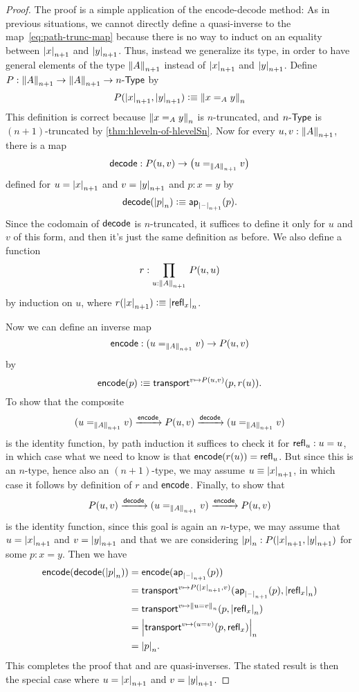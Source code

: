 \begin{proof}
  The proof is a simple application of the encode-decode method:
  As in previous situations, we cannot directly define a quasi-inverse to the map~\eqref{eq:path-trunc-map} because there is no way to induct on an
equality between $\tproj {n+1}x$ and $\tproj {n+1}y$.
  Thus, instead we generalize its type, in order to have general elements of the type $\trunc{n+1}A$ instead of $\tproj {n+1}x$ and $\tproj
{n+1}y$.
  Define $P:\trunc {n+1}A\to\trunc {n+1}A\to\typele{n}$ by
  \[P(\tproj {n+1}x,\tproj {n+1}y)\defeq \trunc n{x=_Ay}\]
  This definition is correct because $\trunc n{x=_Ay}$ is $n$-truncated, and $\typele{n}$ is $(n+1)$-truncated by
\cref{thm:hleveln-of-hlevelSn}.
  Now for every $u,v:\trunc{n+1}A$, there is a map
  \[\decode:P(u,v) \to \big(u=_{\trunc{n+1}A}v\big)\]
  defined for $u=\tproj {n+1}x$ and $v=\tproj {n+1}y$ and $p:x=y$ by
  \[\decode(\tproj n{p})\defeq \apfunc{\tprojf{n+1}} (p).\]
  Since the codomain of $\decode$ is $n$-truncated, it suffices to define it only for $u$ and $v$ of this form, and then it's just the same
definition as before.
  We also define a function
  \[ r : \prd{u:\trunc{n+1} A} P(u,u) \]
  by induction on $u$, where $r(\tproj{n+1} x) \defeq \tproj n {\refl x}$.

  Now we can define an inverse map
  \[\encode: (u=_{\trunc{n+1}A}v) \to P(u,v)\]
  by
  \[\encode(p) \defeq \transfib{v\mapsto P(u,v)}{p}{r(u)}. \]
  To show that the composite
  \[ (u=_{\trunc{n+1}A}v) \xrightarrow{\encode} P(u,v) \xrightarrow{\decode} (u=_{\trunc{n+1}A}v) \]
  is the identity function, by path induction it suffices to check it for $\refl u : u=u$, in which case what we need to know is that
$\encode(r(u)) = \refl{u}$.
  But since this is an $n$-type, hence also an $(n+1)$-type, we may assume $u\jdeq \tproj {n+1} x$, in which case it follows by definition
of $r$ and $\encode$.
  Finally, to show that
  \[ P(u,v) \xrightarrow{\decode} (u=_{\trunc{n+1}A}v) \xrightarrow{\encode} P(u,v) \]
  is the identity function, since this goal is again an $n$-type, we may assume that $u=\tproj {n+1}x$ and $v=\tproj {n+1}y$ and that we are
considering $\tproj n p:P(\tproj{n+1}x,\tproj{n+1}y)$ for some $p:x=y$.
  Then we have
  \begin{align*}
    \encode(\decode(\tproj n p)) &= \encode(\apfunc{\tprojf{n+1}}(p))\\
    &= \transfib{v\mapsto P(\tproj{n+1}x,v)}{\apfunc{\tprojf{n+1}}(p)}{\tproj n {\refl x}}\\
    &= \transfib{v\mapsto \trunc n{u=v}}{p}{\tproj n {\refl x}}\\
    &= \tproj n {\transfib{v \mapsto (u=v)}{p}{\refl x}}\\
    &= \tproj n p.
  \end{align*}
  This completes the proof that \decode and \encode are quasi-inverses.
  The stated result is then the special case where $u=\tproj {n+1}x$ and $v=\tproj {n+1}y$.
\end{proof}


